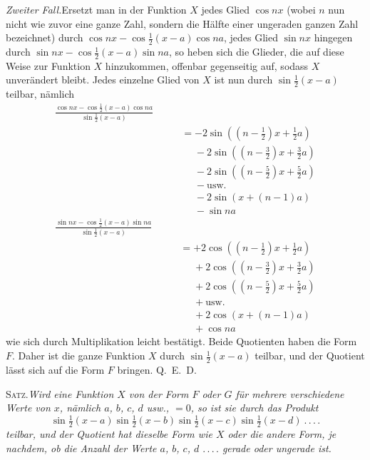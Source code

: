 \textit{Zweiter Fall.}\quad Ersetzt man in der Funktion $X$ jedes Glied $\cos nx$ (wobei $n$ nun nicht wie zuvor eine ganze Zahl, sondern die Hälfte einer ungeraden ganzen Zahl bezeichnet) durch $\cos nx-\cos\tfrac12(x-a)\cos na$, jedes Glied $\sin nx$ hingegen durch $\sin nx-\cos\tfrac12(x-a)\sin na$, so heben sich die Glieder, die auf diese Weise zur Funktion $X$ hinzukommen, offenbar gegenseitig auf, sodass $X$ unverändert bleibt. Jedes einzelne Glied von $X$ ist nun durch $\sin\tfrac12(x-a)$ teilbar, nämlich
\[
\begin{aligned}
\frac{\cos nx-\cos\tfrac12(x-a)\cos na}{\sin\tfrac12(x-a)}\qquad\\[5pt]&=-2\sin((n-\tfrac12)x+\tfrac12a)\\[5pt]
&\phantom{=}{-}2\sin((n-\tfrac32)x+\tfrac32a)\\[5pt]
&\phantom{=}{-}2\sin((n-\tfrac52)x+\tfrac52a)\\[5pt]
&\phantom{=}{-}\text{usw.}\\[5pt]
&\phantom{=}{-}2\sin(x+(n-1)a)\\[5pt]
&\phantom{=}{-}\sin na
\end{aligned}
\]
\[
\begin{aligned}
\frac{\sin nx-\cos\tfrac12(x-a)\sin na}{\sin\tfrac12(x-a)}\qquad\\[5pt]&=+2\cos((n-\tfrac12)x+\tfrac12a)\\[5pt]
&\phantom{=}{+}2\cos((n-\tfrac32)x+\tfrac32a)\\[5pt]
&\phantom{=}{+}2\cos((n-\tfrac52)x+\tfrac52a)\\[5pt]
&\phantom{=}{+}\text{usw.}\\[5pt]
&\phantom{=}{+}2\cos(x+(n-1)a)\\[5pt]
&\phantom{=}{+}\cos na
\end{aligned}
\]
wie sich durch Multiplikation leicht bestätigt. Beide Quotienten haben die Form $F$. Daher ist die ganze Funktion $X$ durch $\sin\tfrac12(x-a)$ teilbar, und der Quotient lässt sich auf die Form $F$ bringen. Q.~E.~D.

\textsc{Satz.}\quad\textit{Wird eine Funktion $X$ von der Form $F$ oder $G$ für mehrere verschiedene Werte von $x$, nämlich $a$, $b$, $c$, $d$ usw., $=0$, so ist sie durch das Produkt}
\[
\sin\tfrac12(x-a)\sin\tfrac12(x-b)\sin\tfrac12(x-c)\sin\tfrac12(x-d)\ .\,.\,.\,.
\]
\textit{teilbar, und der Quotient hat dieselbe Form wie $X$ oder die andere Form, je nachdem, ob die Anzahl der Werte $a$, $b$, $c$, $d$ $.\,.\,.\,.$ gerade oder ungerade ist.}

